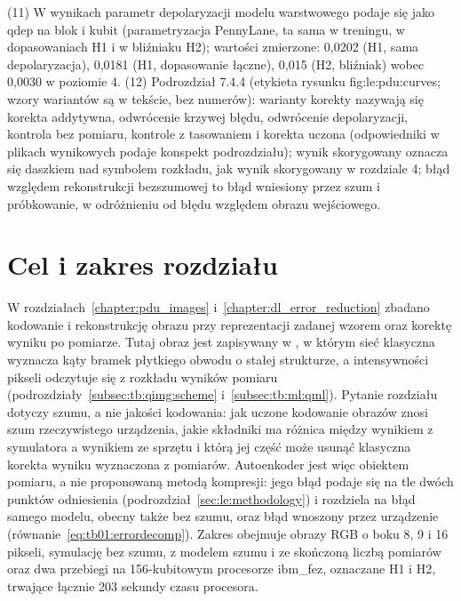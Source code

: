 {(11) W wynikach parametr depolaryzacji modelu warstwowego podaje się jako qdep na blok i kubit (parametryzacja PennyLane, ta sama w treningu, w dopasowaniach H1 i w bliźniaku H2); wartości zmierzone: 0,0202 (H1, sama depolaryzacja), 0,0181 (H1, dopasowanie łączne), 0,015 (H2, bliźniak) wobec 0,0030 w poziomie 4.
(12) Podrozdział 7.4.4 (etykieta rysunku fig:le:pdu:curves; wzory wariantów są w tekście, bez numerów): warianty korekty nazywają się korekta addytywna, odwrócenie krzywej błędu, odwrócenie depolaryzacji, kontrola bez pomiaru, kontrole z tasowaniem i korekta uczona (odpowiedniki w plikach wynikowych podaje konspekt podrozdziału); wynik skorygowany oznacza się daszkiem nad symbolem rozkładu, jak wynik skorygowany w rozdziale 4; błąd względem rekonstrukcji bezszumowej to błąd wniesiony przez szum i próbkowanie, w odróżnieniu od błędu względem obrazu wejściowego.
}

\section{Cel i zakres rozdziału}\label{sec:le:scope}

W rozdziałach~\ref{chapter:pdu_images} i~\ref{chapter:dl_error_reduction} zbadano kodowanie i rekonstrukcję obrazu przy reprezentacji zadanej wzorem oraz korektę wyniku po pomiarze.
Tutaj obraz jest zapisywany w , w którym sieć klasyczna wyznacza kąty bramek płytkiego obwodu o stałej strukturze, a intensywności pikseli odczytuje się z rozkładu wyników pomiaru (podrozdziały~\ref{subsec:tb:qimg:scheme} i~\ref{subsec:tb:ml:qml}).
Pytanie rozdziału dotyczy szumu, a nie jakości kodowania: jak uczone kodowanie obrazów znosi szum rzeczywistego urządzenia, jakie składniki ma różnica między wynikiem z symulatora a wynikiem ze sprzętu i którą jej część może usunąć klasyczna korekta wyniku wyznaczona z pomiarów.
Autoenkoder jest więc obiektem pomiaru, a nie proponowaną metodą kompresji: jego błąd podaje się na tle dwóch punktów odniesienia (podrozdział~\ref{sec:le:methodology}) i rozdziela na błąd samego modelu, obecny także bez szumu,  oraz błąd wnoszony przez urządzenie (równanie~\eqref{eq:tb01:errordecomp}).
Zakres obejmuje obrazy RGB o boku 8, 9 i 16 pikseli, symulację bez szumu, z modelem szumu i ze skończoną liczbą pomiarów oraz dwa przebiegi na 156-kubitowym procesorze ibm\_fez, oznaczane H1 i H2, trwające łącznie 203 sekundy czasu procesora.

